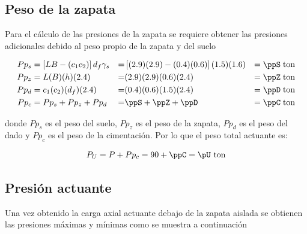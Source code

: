 \documentclass[11pt,a4paper,fleqn]{article}
\begin{document}
\subsection{Peso de la zapata}
Para el cálculo de las presiones de la zapata se requiere obtener las presiones adicionales debido al peso propio de la zapata y del suelo

\begin{align*}
	Pp_{s}&=\left[LB-(c_1c_2)\right]d_f\gamma_s&=&\left[(\lZ)(\bZ)-(\caZ)(\cbZ)\right](\dfZ)(\gammaS)&=&\;\ppS \text{\;ton}\\
	Pp_{z}&=L(B)(h)(2.4)&=&(\lZ)(\bZ)(\hZ)(2.4)&=&\;\ppZ \text{\;ton}\\
	Pp_{d}&=c_1(c_2)(d_f)(2.4)&=&(\caZ)(\cbZ)(\dfZ)(2.4)&=&\;\ppD \text{\;ton}\\
	Pp_{c}&=Pp_{s}+Pp_{z}+Pp_{d}&=&\ppS+\ppZ+\ppD&=&\;\ppC \text{\;ton}
\end{align*}

donde $Pp_{s}$ es el peso del suelo, $Pp_{z}$ es el peso de la zapata, $Pp_{d}$ es el peso del dado y $Pp_{c}$ es el peso de la cimentación. 
Por lo que el peso total actuante es:

\begin{align*}
	P_{U}=P+Pp_{c}=\pZ+\ppC=\pU \text{ ton}
\end{align*}

\subsection{Presión actuante}
Una vez obtenido la carga axial actuante debajo de la zapata aislada se obtienen las presiones máximas y mínimas como se muestra a continuación

\end{document}

